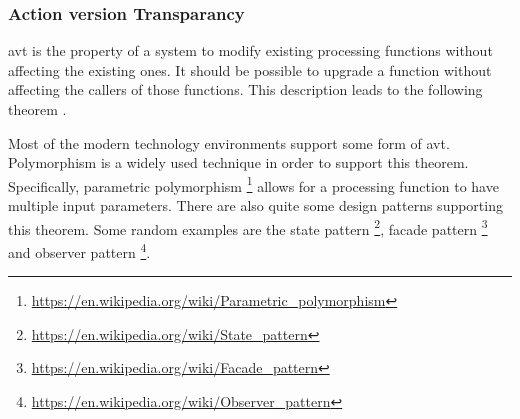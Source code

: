 \subsubsection*{Action version Transparancy}
\gls{avt} is the property of a system to modify existing processing functions without
affecting the existing ones. It should be possible to upgrade a function without affecting
the callers of those functions. This description leads to the following theorem
\parencite[282]{mannaert_normalized_2016}.


Most of the modern technology environments support some form of \gls{avt}. Polymorphism is
a widely used technique in order to support this theorem. Specifically, parametric
polymorphism \footnote{\url{https://en.wikipedia.org/wiki/Parametric_polymorphism}} allows
for a processing function to have multiple input parameters. There are also quite some
design patterns supporting this theorem. Some random examples are the state pattern
\footnote{\url{https://en.wikipedia.org/wiki/State_pattern}}, facade pattern
\footnote{\url{https://en.wikipedia.org/wiki/Facade_pattern}} and observer pattern
\footnote{\url{https://en.wikipedia.org/wiki/Observer_pattern}}.